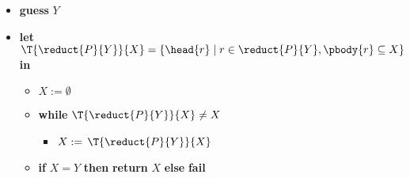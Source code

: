 \begin{frame}{}
\begin{itemize}
  \item<only@12> []\small \textbf{guess} $Y$
  \item<only@12> []\small \textbf{let} $\T{\reduct{P}{Y}}{X}=\{\head{r}\mid r\in \reduct{P}{Y}, \pbody{r}\subseteq X\}$ \textbf{in}
    \begin{itemize}
    \item []$X := \emptyset$
      \smallskip
    \item []\textbf{while} {$\T{\reduct{P}{Y}}{X}\neq X$}
      \begin{itemize}\small
      \item[] $X := {\,\T{\reduct{P}{Y}}{X}}$
      \end{itemize}
    \item[]\small \textbf{if} $X=Y$ \textbf{then} \textbf{return} $X$ \textbf{else} \textbf{fail}
    \end{itemize}

  \end{itemize}
\end{frame}
%
